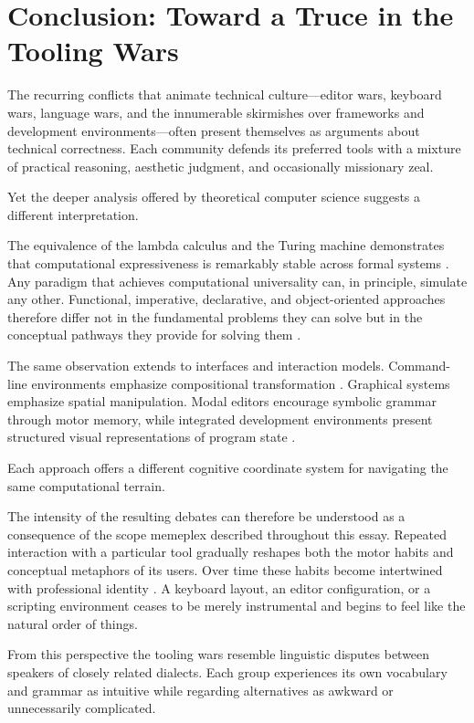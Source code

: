 \documentclass[12pt]{article}
\theoremstyle{definition}
\begin{document}
\section{Conclusion: Toward a Truce in the Tooling Wars}

The recurring conflicts that animate technical culture---editor wars,
keyboard wars, language wars, and the innumerable skirmishes over
frameworks and development environments---often present themselves as
arguments about technical correctness. Each community defends its
preferred tools with a mixture of practical reasoning, aesthetic
judgment, and occasionally missionary zeal.

Yet the deeper analysis offered by theoretical computer science suggests
a different interpretation.

The equivalence of the lambda calculus and the Turing machine
demonstrates that computational expressiveness is remarkably stable
across formal systems \cite{church1936,turing1936,kleene1952}. Any
paradigm that achieves computational universality can, in principle,
simulate any other. Functional, imperative, declarative, and
object-oriented approaches therefore differ not in the fundamental
problems they can solve but in the conceptual pathways they provide for
solving them \cite{backus1978}.

The same observation extends to interfaces and interaction models.
Command-line environments emphasize compositional transformation
\cite{ritchie1974,mcilroy1978}. Graphical systems emphasize spatial
manipulation. Modal editors encourage symbolic grammar through motor
memory, while integrated development environments present structured
visual representations of program state \cite{norman1988}.

Each approach offers a different cognitive coordinate system for
navigating the same computational terrain.

The intensity of the resulting debates can therefore be understood as a
consequence of the scope memeplex described throughout this essay.
Repeated interaction with a particular tool gradually reshapes both the
motor habits and conceptual metaphors of its users. Over time these
habits become intertwined with professional identity
\cite{norman1988,brooks1975}. A keyboard layout, an editor configuration,
or a scripting environment ceases to be merely instrumental and begins
to feel like the natural order of things.

From this perspective the tooling wars resemble linguistic disputes
between speakers of closely related dialects. Each group experiences its
own vocabulary and grammar as intuitive while regarding alternatives as
awkward or unnecessarily complicated.
\end{document}
